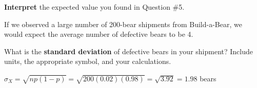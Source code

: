 \documentclass[noanswers]{exam}
\begin{document}
\begin{questions}
\begin{solution}[\stretch{1}]
	\vspace{2mm}

	\end{solution}	
	
	\question \textbf{Interpret} the expected value you found in Question \#5.
	
	\begin{solution}[\stretch{1}]
	
	\vspace{2mm}

	If we observed a large number of 200-bear shipments from Build-a-Bear, we would expect the average number of defective bears to be 4.
	
	\vspace{2mm}

	\end{solution}	
	
	\question What is the \textbf{standard deviation} of defective bears in your shipment? Include units, the appropriate symbol, and your calculations.
	
	\begin{solution}[\stretch{1}]
	
	\vspace{2mm}

	$\sigma_X=\sqrt{np(1-p)}=\sqrt{200(0.02)(0.98)}=\sqrt{3.92}=1.98$ bears
	
	\vspace{2mm}

	\end{solution}		
	 
\end{questions}
\end{document}
